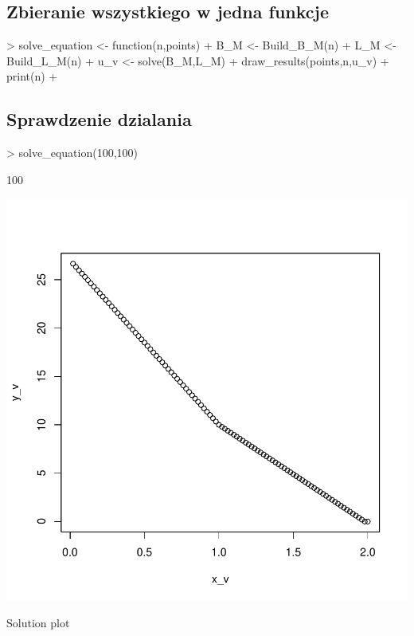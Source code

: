 \documentclass{article}
\begin{document}
\subsection{Zbieranie wszystkiego w jedna funkcje}
\begin{Schunk}
\begin{Sinput}
> solve_equation <- function(n,points){
+   B_M <- Build_B_M(n)
+   L_M <- Build_L_M(n)
+   u_v <- solve(B_M,L_M)
+   draw_results(points,n,u_v)
+   print(n)
+ }
\end{Sinput}
\end{Schunk}

\subsection{Sprawdzenie dzialania}
\begin{centerfig}
\begin{Schunk}
\begin{Sinput}
> solve_equation(100,100)
\end{Sinput}
\begin{Soutput}
[1] 100
\end{Soutput}
\end{Schunk}
\includegraphics{Report-011}
\caption{Solution plot}
\end{centerfig}
\end{document}

